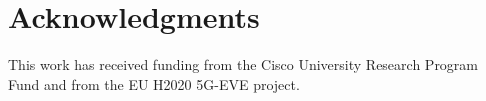\documentclass[10pt,journal,twocolumn]{IEEEtran}
\begin{document}






\begin{comment}

\end{comment}





\section*{Acknowledgments}
This work has received funding from the Cisco University Research Program Fund and from the EU H2020 5G-EVE project.



\end{document}
